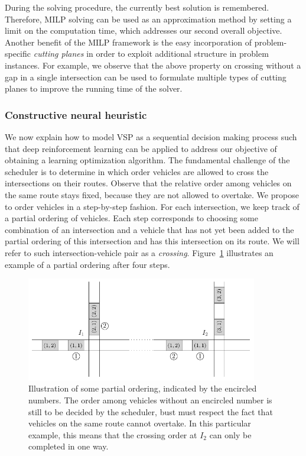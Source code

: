 \documentclass{article}
\theoremstyle{definition}
\theoremstyle{plain}
\begin{document}
During the solving procedure, the currently best solution is remembered.
Therefore, MILP solving can be used as an approximation method by setting a
limit on the computation time, which addresses our second overall objective.
%
Another benefit of the MILP framework is the easy incorporation of
problem-specific \textit{cutting planes} in order to exploit additional
structure in problem instances. For example, we observe that the above property
on crossing without a gap in a single intersection can be used to formulate
multiple types of cutting planes to improve the running time of the solver.


\subsubsection{Constructive neural heuristic}
\label{sec:constructive_neural}


We now explain how to model VSP as a sequential decision making process such
that deep reinforcement learning can be applied to address our objective of
obtaining a learning optimization algorithm.
The fundamental challenge of the scheduler is to determine in which order
vehicles are allowed to cross the intersections on their routes. Observe that
the relative order among vehicles on the same route stays fixed, because they
are not allowed to overtake.
%
We propose to order vehicles in a step-by-step fashion. For each intersection,
we keep track of a partial ordering of vehicles. Each step corresponds to
choosing some combination of an intersection and a vehicle that has not yet been
added to the partial ordering of this intersection and has this intersection on
its route. We will refer to such intersection-vehicle pair as a \textit{crossing}.
Figure~\ref{fig:network_ordering} illustrates an example of a partial ordering after four steps.

\begin{figure}[h]
  \centering
  \includegraphics[width=0.9\textwidth]{figures/network_ordering.pdf}
  \caption{Illustration of some partial ordering, indicated by the encircled
    numbers. The order among vehicles without an encircled number is still to be
    decided by the scheduler, bust must respect the fact that vehicles on the
    same route cannot overtake. In this particular example, this means that the
    crossing order at $I_{2}$ can only be completed in one way.}
  \label{fig:network_ordering}
\end{figure}
\end{document}
